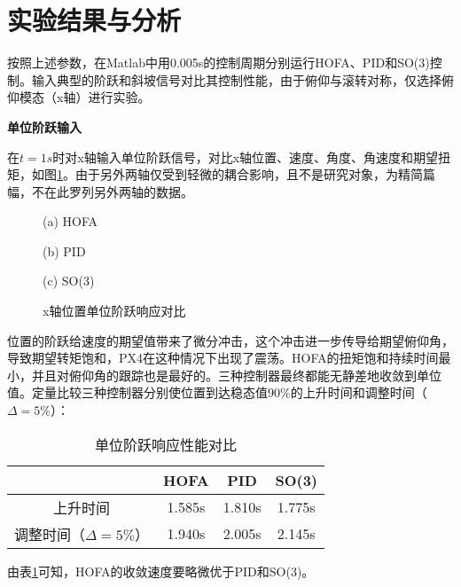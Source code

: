   \section{实验结果与分析}

  按照上述参数，在Matlab中用0.005s的控制周期分别运行HOFA、PID和SO(3)控制。输入典型的阶跃和斜坡信号对比其控制性能，由于俯仰与滚转对称，仅选择俯仰模态（x轴）进行实验。

  \textbf{单位阶跃输入}

  在$t=1s$时对x轴输入单位阶跃信号，对比x轴位置、速度、角度、角速度和期望扭矩，如图\ref{matlab_阶跃}。由于另外两轴仅受到轻微的耦合影响，且不是研究对象，为精简篇幅，不在此罗列另外两轴的数据。

  \begin{figure}[h]
    \centering
    \begin{minipage}[t]{0.33\textwidth}
      \centering
      \caption*{(a) HOFA}
    \end{minipage}\hfill
    \begin{minipage}[t]{0.33\textwidth}
      \centering
      \caption*{(b) PID}
    \end{minipage}\hfill
    \begin{minipage}[t]{0.33\textwidth}
      \centering
      \caption*{(c) SO(3)}
    \end{minipage}
    \caption{x轴位置单位阶跃响应对比}
    \label{matlab_阶跃}
\end{figure}

位置的阶跃给速度的期望值带来了微分冲击，这个冲击进一步传导给期望俯仰角，导致期望转矩饱和，PX4在这种情况下出现了震荡。HOFA的扭矩饱和持续时间最小，并且对俯仰角的跟踪也是最好的。三种控制器最终都能无静差地收敛到单位值。定量比较三种控制器分别使位置到达稳态值$90\%$的上升时间和调整时间（$\Delta = 5\%$）：


\begin{table}[h]
  \centering
  \caption{单位阶跃响应性能对比}
  \begin{tabular}{cccc}
      \toprule
      & HOFA & PID & SO(3) \\
      \midrule
    上升时间 & 1.585s & 1.810s & 1.775s\\
    调整时间（$\Delta = 5\%$） & 1.940s & 2.005s &2.145s \\
      \bottomrule
  \end{tabular}

  \label{matlab阶跃对比}
\end{table}
由表\ref{matlab阶跃对比}可知，HOFA的收敛速度要略微优于PID和SO(3)。

